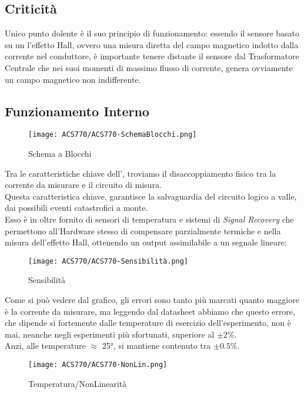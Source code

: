 \subsection{Criticità}
Unico punto dolente è il suo principio di funzionamento: essendo il sensore basato su un l'effetto Hall, ovvero una misura diretta del campo magnetico indotto dalla corrente nel conduttore, è importante tenere distante il sensore dal Trasformatore Centrale che nei suoi momenti di massimo flusso di corrente, genera ovviamente un campo magnetico non indifferente.

\subsection{Funzionamento Interno}
\vspace{-5mm}
\begin{figure}[h]
	\centering
	\texttt{[image: ACS770/ACS770-SchemaBlocchi.png]}
	\caption[ Schema a Blocchi]{Schema a Blocchi}
\end{figure}
\noindent
Tra le caratteristiche chiave dell'\cite{ACS770}, troviamo il disaccoppiamento fisico tra la corrente da misurare e il circuito di misura.\\
Questa caratteristica chiave, garantisce la salvaguardia del circuito logico a valle, dai possibili eventi catastrofici a monte.\\
Esso è in oltre fornito di sensori di temperatura e sistemi di \textit{Signal Recovery} che permettono all'Hardware stesso di compensare parzialmente \nonLinearita termiche e nella misura dell'effetto Hall, ottenendo un output assimilabile a un segnale lineare:

\begin{figure}[h]
	\centering
	\texttt{[image: ACS770/ACS770-Sensibilità.png]}
	\caption[ Sensibilità rispetto Temperatura]{Sensibilità}
\end{figure}

\noindent
Come si può vedere dal grafico, gli errori sono tanto più marcati quanto maggiore è la corrente da misurare, ma leggendo dal datasheet abbiamo che questo errore, che dipende si fortemente dalle temperature di esercizio dell'esperimento, non è mai, neanche negli esperimenti più sfortunati, superiore al $\pm2\%$.\\
Anzi, alle temperature $\approx$ 25°, si mantiene contenuto tra $\pm0.5\%$.

\begin{figure}[h]
	\centering
	\texttt{[image: ACS770/ACS770-NonLin.png]}
	\caption[ \nonLinearita]{Temperatura/NonLinearità}
\end{figure}

